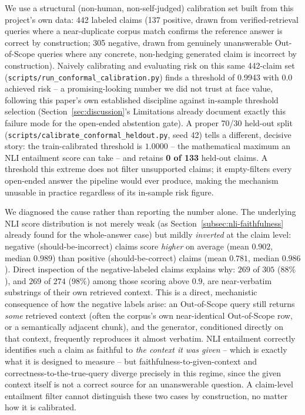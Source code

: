 \documentclass[a4paper,twoside]{article}
\begin{document}
We use a structural (non-human, non-self-judged) calibration set built from this project's own data: 442 labeled claims (137 positive, drawn from verified-retrieval queries where a near-duplicate corpus match confirms the reference answer is correct by construction; 305 negative, drawn from genuinely unanswerable Out-of-Scope queries where any concrete, non-hedging generated claim is incorrect by construction). Naively calibrating and evaluating risk on this same 442-claim set (\texttt{scripts/run\_conformal\_calibration.py}) finds a threshold of 0.9943 with 0.0 achieved risk -- a promising-looking number we did not trust at face value, following this paper's own established discipline against in-sample threshold selection (Section~\ref{sec:discussion}'s Limitations already document exactly this failure mode for the open-ended abstention gate). A proper 70/30 held-out split (\texttt{scripts/calibrate\_conformal\_heldout.py}, seed 42) tells a different, decisive story: the train-calibrated threshold is $1.0000$ -- the mathematical maximum an NLI entailment score can take -- and retains \textbf{0 of 133} held-out claims. A threshold this extreme does not filter unsupported claims; it empty-filters every open-ended answer the pipeline would ever produce, making the mechanism unusable in practice regardless of its in-sample risk figure.

We diagnosed the cause rather than reporting the number alone. The underlying NLI score distribution is not merely weak (as Section~\ref{subsec:nli-faithfulness} already found for the whole-answer case) but mildly \emph{inverted} at the claim level: negative (should-be-incorrect) claims score \emph{higher} on average (mean $0.902$, median $0.989$) than positive (should-be-correct) claims (mean $0.781$, median $0.986$). Direct inspection of the negative-labeled claims explains why: $269$ of $305$ ($88\%$), and $269$ of $274$ ($98\%$) among those scoring above $0.9$, are near-verbatim substrings of their own retrieved context. This is a direct, mechanistic consequence of how the negative labels arise: an Out-of-Scope query still returns \emph{some} retrieved context (often the corpus's own near-identical Out-of-Scope row, or a semantically adjacent chunk), and the generator, conditioned directly on that context, frequently reproduces it almost verbatim. NLI entailment correctly identifies such a claim as faithful to \emph{the context it was given} -- which is exactly what it is designed to measure -- but faithfulness-to-given-context and correctness-to-the-true-query diverge precisely in this regime, since the given context itself is not a correct source for an unanswerable question. A claim-level entailment filter cannot distinguish these two cases by construction, no matter how it is calibrated.
\end{document}
